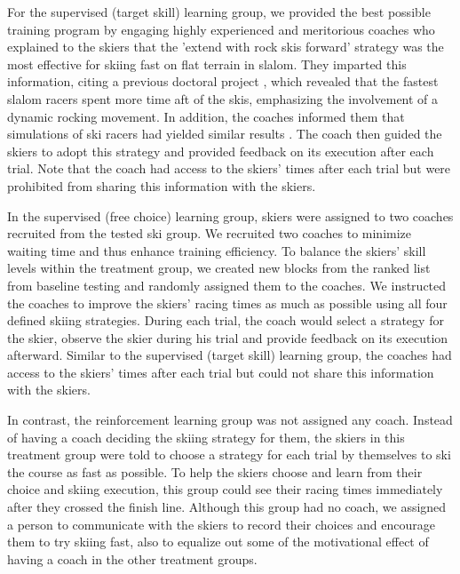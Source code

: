 \documentclass{article}
\begin{document}
For the supervised (target skill) learning group, we provided the best possible training program by engaging highly experienced and meritorious coaches who explained to the skiers that the 'extend with rock skis forward' strategy was the most effective for skiing fast on flat terrain in slalom. They imparted this information, citing a previous doctoral project \cite{reid_kinematic_2010}, which revealed that the fastest slalom racers spent more time aft of the skis, emphasizing the involvement of a dynamic rocking movement. In addition, the coaches informed them that simulations of ski racers had yielded similar results \cite{mote_accelerations_1983, lind_physics_2013}. The coach then guided the skiers to adopt this strategy and provided feedback on its execution after each trial. Note that the coach had access to the skiers' times after each trial but were prohibited from sharing this information with the skiers.

In the supervised (free choice) learning group, skiers were assigned to two coaches recruited from the tested ski group. We recruited two coaches to minimize waiting time and thus enhance training efficiency. To balance the skiers' skill levels within the treatment group, we created new blocks from the ranked list from baseline testing and randomly assigned them to the coaches. We instructed the coaches to improve the skiers' racing times as much as possible using all four defined skiing strategies. During each trial, the coach would select a strategy for the skier, observe the skier during his trial and provide feedback on its execution afterward. Similar to the supervised (target skill) learning group, the coaches had access to the skiers' times after each trial but could not share this information with the skiers.

In contrast, the reinforcement learning group was not assigned any coach. Instead of having a coach deciding the skiing strategy for them, the skiers in this treatment group were told to choose a strategy for each trial by themselves to ski the course as fast as possible. To help the skiers choose and learn from their choice and skiing execution, this group could see their racing times immediately after they crossed the finish line. Although this group had no coach, we assigned a person to communicate with the skiers to record their choices and encourage them to try skiing fast, also to equalize out some of the motivational effect of having a coach in the other treatment groups. 
\end{document}
